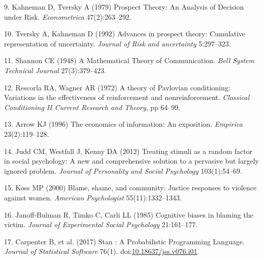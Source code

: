 \documentclass[9pt,twocolumn,twoside,]{pnas-new}
\begin{document}
\hypertarget{ref-Kahneman1979}{}
9. Kahneman D, Tversky A (1979) Prospect Theory: An Analysis of Decision
under Risk. \emph{Econometrica} 47(2):263--292.

\hypertarget{ref-Tversky1992}{}
10. Tversky A, Kahneman D (1992) Advances in prospect theory: Cumulative
representation of uncertainty. \emph{Journal of Risk and uncertainty}
5:297--323.

\hypertarget{ref-Shannon1948}{}
11. Shannon CE (1948) A Mathematical Theory of Communication. \emph{Bell
System Technical Journal} 27(3):379--423.

\hypertarget{ref-Rescorla1972}{}
12. Rescorla RA, Wagner AR (1972) A theory of Pavlovian conditioning:
Variations in the effectiveness of reinforcement and nonreinforcement.
\emph{Classical Conditioning II Current Research and Theory}, pp 64--99.

\hypertarget{ref-Arrow1996}{}
13. Arrow KJ (1996) The economics of information: An exposition.
\emph{Empirica} 23(2):119--128.

\hypertarget{ref-Judd2012}{}
14. Judd CM, Westfall J, Kenny DA (2012) Treating stimuli as a random
factor in social psychology: A new and comprehensive solution to a
pervasive but largely ignored problem. \emph{Journal of Personality and
Social Psychology} 103(1):54--69.

\hypertarget{ref-Koss2000}{}
15. Koss MP (2000) Blame, shame, and community: Justice responses to
violence against women. \emph{American Psychologist} 55(11):1332--1343.

\hypertarget{ref-Janoff-bulman1985}{}
16. Janoff-Bulman R, Timko C, Carli LL (1985) Cognitive biases in
blaming the victim. \emph{Journal of Experimental Social Psychology}
21:161--177.

\hypertarget{ref-Carpenter2017}{}
17. Carpenter B, et al. (2017) Stan : A Probabilistic Programming
Language. \emph{Journal of Statistical Software} 76(1).
doi:\href{https://doi.org/10.18637/jss.v076.i01}{10.18637/jss.v076.i01}.



% 
\end{document}
